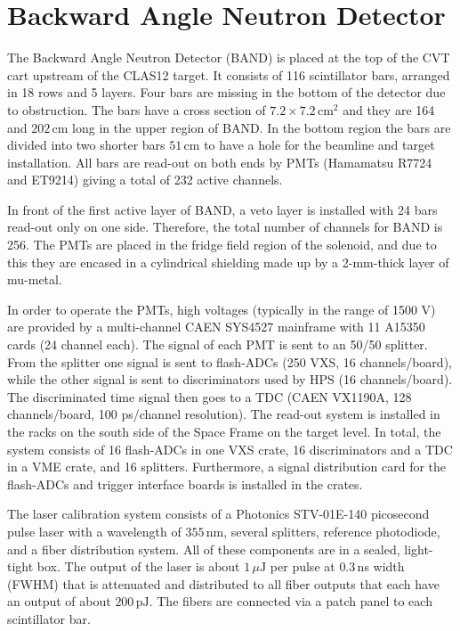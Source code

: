 \section{Backward Angle Neutron Detector}
The Backward Angle Neutron Detector (BAND) is placed at the top of the CVT cart upstream of the CLAS12 target. It consists of 116 scintillator bars, arranged in 18 rows and 5 layers. Four bars are missing in the bottom of the detector due to obstruction. The bars have a cross section of $7.2 \times 7.2\,\mathrm{cm}^{2}$ and they are 164 and $202\,\mathrm{cm}$ long in the upper region of BAND. In the bottom region the bars are divided into two shorter bars $51\,\mathrm{cm}$ to have a hole for the beamline and target installation. All bars are read-out on both ends by PMTs (Hamamatsu R7724 and ET9214) giving a total of 232 active channels. 

In front of the first active layer of BAND, a veto layer is installed with 24 bars read-out only on one side. Therefore, the total number of channels for BAND is 256.
The PMTs are placed in the fridge field region of the solenoid, and due to this they are encased in a cylindrical shielding made up by a 2-mm-thick layer of mu-metal.

In order to operate the PMTs, high voltages (typically in the range of 1500 V) are provided by a multi-channel CAEN SYS4527 mainframe with 11 A15350 cards (24 channel each).
The signal of each PMT is sent to an 50/50 splitter.
From the splitter one signal is sent to flash-ADCs (250 VXS, 16 channels/board), while the other signal is sent to discriminators used by HPS (16 channels/board).
The discriminated time signal then goes to a TDC (CAEN VX1190A, 128 channels/board, 100 ps/channel resolution). The read-out system is installed in the racks on the south side of the Space Frame on the target level. 
In total, the system consists of 16 flash-ADCs in one VXS crate, 16 discriminators and a TDC in a VME crate, and 16 splitters. Furthermore, a signal distribution card for the flash-ADCs and trigger interface boards is installed in the crates.

The laser calibration system consists of a Photonics STV-01E-140 picosecond pulse laser with a wavelength of $355\,\mathrm{nm}$, several splitters, reference photodiode, and a fiber distribution system. All of these components are in a sealed, light-tight box. The output of the laser is about $1\,\mu\mathrm{J}$ per pulse at $0.3\,$ns width (FWHM) that is attenuated and distributed to all fiber outputs that each have an output of about $200\,\mathrm{pJ}$. The fibers are connected via a patch panel to each scintillator bar.

